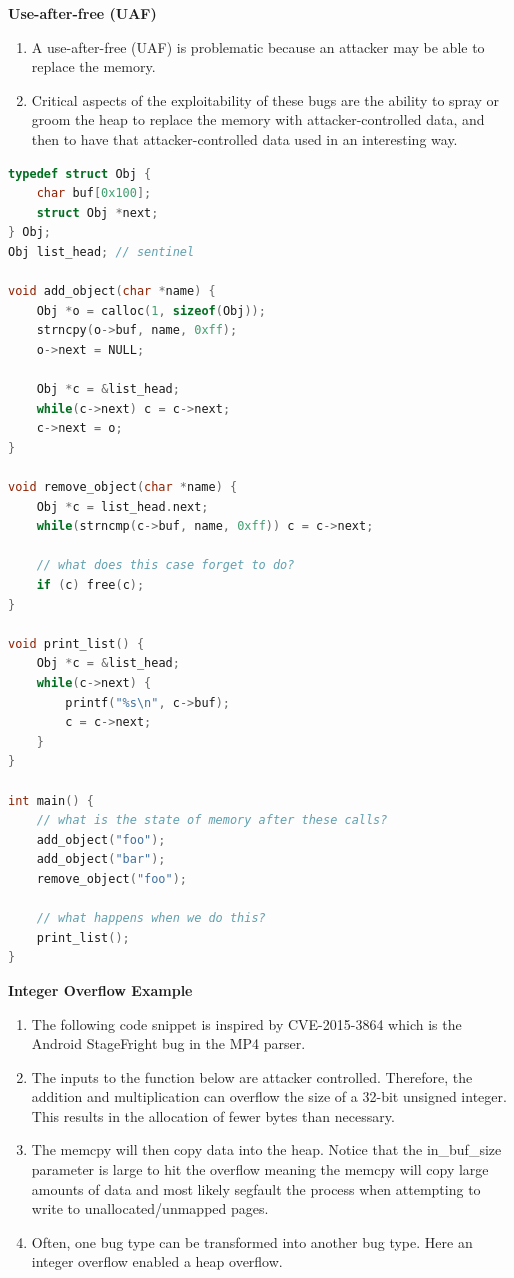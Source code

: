 \documentclass[12pt]{Training}
\begin{document}
\textbf{Use-after-free (UAF)}
\begin{enumerate}
    \item A use-after-free (UAF) is problematic because an attacker may be able to replace the memory.
    \item Critical aspects of the exploitability of these bugs are the ability to spray or groom the heap to replace the memory with attacker-controlled data, and then to have that attacker-controlled data used in an interesting way.
\end{enumerate}
\begin{sectionbox}
\begin{lstlisting}[language=C, caption={Use-after-free}]
typedef struct Obj {
    char buf[0x100];
    struct Obj *next;
} Obj;
Obj list_head; // sentinel

void add_object(char *name) {
    Obj *o = calloc(1, sizeof(Obj));
    strncpy(o->buf, name, 0xff);
    o->next = NULL;

    Obj *c = &list_head;
    while(c->next) c = c->next;
    c->next = o;
}

void remove_object(char *name) {
    Obj *c = list_head.next;
    while(strncmp(c->buf, name, 0xff)) c = c->next;

    // what does this case forget to do?
    if (c) free(c);
}

void print_list() {
    Obj *c = &list_head;
    while(c->next) {
        printf("%s\n", c->buf);
        c = c->next;
    }
}

int main() {
    // what is the state of memory after these calls?
    add_object("foo");
    add_object("bar");
    remove_object("foo");

    // what happens when we do this?
    print_list();
}
\end{lstlisting}
\end{sectionbox}

\textbf{Integer Overflow Example}
\begin{enumerate}
	\item The following code snippet is inspired by CVE-2015-3864 which is the Android StageFright bug in the MP4 parser.
	\item The inputs to the function below are attacker controlled. Therefore, the addition and multiplication can overflow the size of a 32-bit unsigned integer. This results in the allocation of fewer bytes than necessary.
	\item The memcpy will then copy data into the heap. Notice that the in\_buf\_size parameter is large to hit the overflow meaning the memcpy will copy large amounts of data and most likely segfault the process when attempting to write to unallocated/unmapped pages.
	\item Often, one bug type can be transformed into another bug type. Here an integer overflow enabled a heap overflow.
\end{enumerate}
\end{document}
